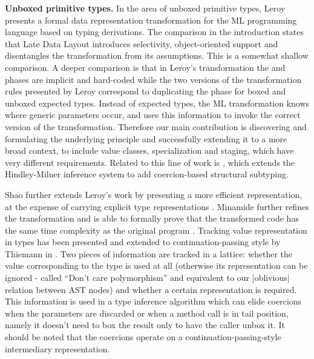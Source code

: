 \textbf{Unboxed primitive types.} In the area of unboxed primitive types, {Leroy} \cite{leroy-unboxed-objects} presents a formal data representation transformation for the ML programming language based on typing derivations. The comparison in the introduction states that Late Data Layout introduces selectivity, object-oriented support and disentangles the transformation from its assumptions. This is a somewhat shallow comparison. A deeper comparison is that in {Leroy}'s transformation the \inject{} and \commit{} phases are implicit and hard-coded while the two versions of the transformation rules presented by {Leroy} correspond to duplicating the \coerce{} phase for boxed and unboxed expected types. Instead of expected types, the ML transformation knows where generic parameters occur, and uses this information to invoke the correct version of the transformation. Therefore our main contribution is discovering and formulating the underlying principle and successfully extending it to a more broad context, to include value classes, specialization and staging, which have very different requirements. Related to this line of work is \cite{traytel-hindley-milner-coercions}, which extends the Hindley-Milner inference system to add coercion-based structural subtyping.

Shao further extends Leroy's work \cite{shao-compiler-ml, shao-flexible-representation-analysis} by presenting a more efficient representation, at the expense of carrying explicit type representations \cite{harper-intensional-type-analysis, tarditi-til}. Minamide further refines the transformation and is able to formally prove that the transformed code has the same time complexity as the original program \cite{minamide-unboxing-runtime-complexity}. Tracking value representation in types has been presented and extended to continuation-passing style \cite{flanagan-essence-cps} by Thiemann in \cite{thiemann-unboxed-objects-cps}. Two pieces of information are tracked in a lattice: whether the value corresponding to the type is used at all (otherwise its representation can be ignored - called ``Don't care polymorphism'' and equivalent to our |oblivious| relation between AST nodes) and whether a certain representation is required. This information is used in a type inference algorithm which can elide coercions when the parameters are discarded or when a method call is in tail position, namely it doesn't need to box the result only to have the caller unbox it. It should be noted that the coercions operate on a continuation-passing-style intermediary representation.

